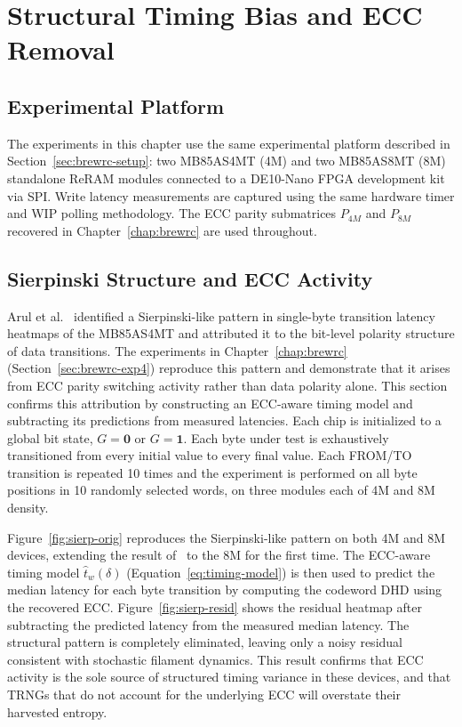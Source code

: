 \section{Structural Timing Bias and ECC Removal}
\label{sec:trng-structural}

\subsection{Experimental Platform}
The experiments in this chapter use the same experimental platform
described in Section~\ref{sec:brewrc-setup}: two MB85AS4MT (4M) and two
MB85AS8MT (8M) standalone ReRAM modules connected to a DE10-Nano FPGA
development kit via SPI. Write latency measurements are captured using
the same hardware timer and WIP polling methodology. The ECC parity
submatrices $P_{4M}$ and $P_{8M}$ recovered in Chapter~\ref{chap:brewrc}
are used throughout.

\subsection{Sierpinski Structure and ECC Activity}



Arul et al.~\cite{tolga2024trng} identified a Sierpinski-like pattern in
single-byte transition latency heatmaps of the MB85AS4MT and attributed
it to the bit-level polarity structure of data transitions. The
experiments in Chapter~\ref{chap:brewrc} (Section~\ref{sec:brewrc-exp4})
reproduce this pattern and demonstrate that it arises from ECC parity
switching activity rather than data polarity alone. This section
confirms this attribution by constructing an ECC-aware timing model and
subtracting its predictions from measured latencies. Each chip is
initialized to a global bit state, $G=\mathbf{0}$ or $G=\mathbf{1}$.
Each byte under test is exhaustively transitioned from every initial
value to every final value. Each FROM/TO transition is repeated 10 times
and the experiment is performed on all byte positions in 10 randomly
selected words, on three modules each of 4M and 8M density.



Figure~\ref{fig:sierp-orig} reproduces the Sierpinski-like pattern on
both 4M and 8M devices, extending the result of~\cite{tolga2024trng} to
the 8M for the first time. The ECC-aware timing model
$\hat{t}_w(\delta)$ (Equation~\ref{eq:timing-model}) is then used to
predict the median latency for each byte transition by computing the
codeword DHD using the recovered ECC. Figure~\ref{fig:sierp-resid} shows
the residual heatmap after subtracting the predicted latency from the
measured median latency. The structural pattern is completely
eliminated, leaving only a noisy residual consistent with stochastic
filament dynamics. This result confirms that ECC activity is the sole
source of structured timing variance in these devices, and that TRNGs
that do not account for the underlying ECC will overstate their
harvested entropy.

